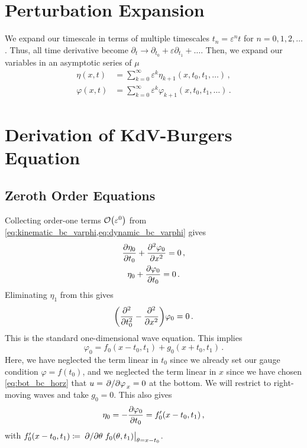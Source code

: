 \documentclass{jfm}
\renewcommand*{\epsilon}{\varepsilon}
\begin{document}
\section{Perturbation Expansion}
\label{sec:shallow_water}
We expand our timescale in terms of multiple timescales $t_n =
\epsilon^n t$ for $n= 0,1,2,\ldots$.
Thus, all time derivative become $\partial_t \to \partial_{t_0} +
\epsilon \partial_{t_1} + \ldots$.
Then, we expand our variables in an asymptotic series of $\mu$
\begin{align}
  \eta(x,t) &= \sum_{k=0}^{\infty} \epsilon^k
    \eta_{k+1}(x,t_0,t_1,\ldots) \,, \\
  \varphi(x,t) &= \sum_{k=0}^{\infty} \epsilon^k
    \varphi_{k+1}(x,t_0,t_1,\ldots) \,.
\end{align}

\section{Derivation of KdV-Burgers Equation}
\subsection{Zeroth Order Equations}
Collecting order-one terms $\order{\epsilon^0}$ from
\cref{eq:kinematic_bc_varphi,eq:dynamic_bc_varphi} gives
\begin{gather}
  \pdv{\eta_0}{t_0} + \pdv[2]{\varphi_0}{x} = 0 \,, \\
  \eta_0 + \pdv{\varphi_0}{t_0} = 0 \,.
\end{gather}
Eliminating $\eta_1$ from this gives
\begin{equation}
  \pqty{\pdv[2]{t_0} - \pdv[2]{x} } \varphi_0 = 0 \,.
  \label{eq:wave_eq}
\end{equation}
This is the standard one-dimensional wave equation.
This implies
\begin{equation}
  \varphi_0 = f_0(x-t_0,t_1) + g_0(x+t_0,t_1) \,.
  \label{eq:phi0_sol}
\end{equation}
Here, we have neglected the term linear in $t_0$ since we already set
our gauge condition $\varphi = f(t_0)$, and we neglected the term linear
in $x$ since we have chosen \cref{eq:bot_bc_horz} that $u =
\pdv*{\varphi}_x = 0$ at the bottom.
We will restrict to right-moving waves and take $g_0 = 0$.
This also gives
\begin{equation}
  \eta_0 = - \pdv{\varphi_0}{t_0} = f_0'(x-t_0,t_1) \,,
  \label{eq:eta0_sol}
\end{equation}
with $f_0'(x-t_0,t_1) \coloneqq \eval{\pdv*{\theta}
f_0(\theta,t_1)}_{\theta = x-t_0}$.
\end{document}
